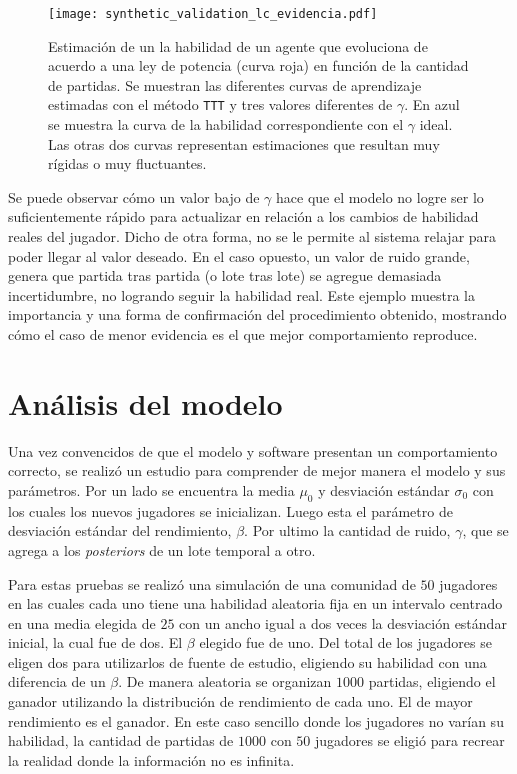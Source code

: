 \documentclass[11pt,twoside,spanish]{report} %
\begin{document}
\begin{figure}[H]
	\centering
	\texttt{[image: synthetic\_validation\_lc\_evidencia.pdf]}
	\caption{Estimaci\'on de un la habilidad de un agente que evoluciona de acuerdo a una ley de potencia (curva roja) en funci\'on de la cantidad de partidas.
	Se muestran las diferentes curvas de aprendizaje estimadas con el m\'etodo \texttt{TTT} y tres valores diferentes de $\gamma$.
    En azul se muestra la curva de la habilidad correspondiente con el $\gamma$ ideal.
	Las otras dos curvas representan estimaciones que resultan muy r\'igidas o muy fluctuantes.
	}
	\label{fig:lcVSevi}
\end{figure}

Se puede observar c\'omo un valor bajo de $\gamma$ hace que el modelo no logre ser lo suficientemente r\'apido para actualizar en relaci\'on a los cambios de habilidad reales del jugador.
Dicho de otra forma, no se le permite al sistema relajar para poder llegar al valor deseado.
En el caso opuesto, un valor de ruido grande, genera que partida tras partida (o lote tras lote) se agregue demasiada incertidumbre, no logrando seguir la habilidad real.
Este ejemplo muestra la importancia y una forma de confirmaci\'on del procedimiento obtenido, mostrando c\'omo el caso de menor evidencia es el que mejor comportamiento reproduce.

\section{An\'alisis del modelo}\label{sec:analisisModelo} 

Una vez convencidos de que el modelo y software presentan un comportamiento correcto, se realiz\'o un estudio para comprender de mejor manera el modelo y sus par\'ametros.
Por un lado se encuentra la media $\mu_0$ y desviaci\'on est\'andar $\sigma_0$ con los cuales los nuevos jugadores se inicializan.
Luego esta el par\'ametro de desviaci\'on est\'andar del rendimiento, $\beta$.
Por ultimo la cantidad de ruido, $\gamma$, que se agrega a los \textit{posteriors} de un lote temporal a otro.

Para estas pruebas se realiz\'o una simulaci\'on de una comunidad de $50$ jugadores en las cuales cada uno tiene una habilidad aleatoria fija en un intervalo centrado en una media elegida de $25$ con un ancho igual a dos veces la desviaci\'on est\'andar inicial, la cual fue de dos.
El $\beta$ elegido fue de uno.
Del total de los jugadores se eligen dos para utilizarlos de fuente de estudio, eligiendo su habilidad con una diferencia de un $\beta$.
De manera aleatoria se organizan $1000$ partidas, eligiendo el ganador utilizando la distribuci\'on de rendimiento de cada uno.
El de mayor rendimiento es el ganador.
En este caso sencillo donde los jugadores no var\'ian su habilidad, la cantidad de partidas de $1000$ con $50$ jugadores se eligi\'o para recrear la realidad donde la informaci\'on no es infinita.
\end{document}
